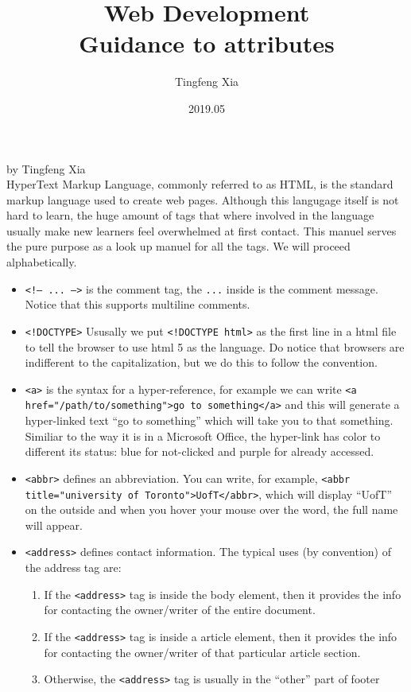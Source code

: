 \documentclass[oneside, 12pt]{article}
\title{%
  \textbf{Web Development}\\
  \large Guidance to attributes}
\author{Tingfeng Xia}
\date{2019.05}
\newcommand{\itemm}[1]{\item \texttt{#1}}
\begin{document}
\maketitle
\newpage %
\mbox{}
\vfill
\noindent by Tingfeng Xia \\


\noindent HyperText Markup Language, commonly referred to as HTML, 
is the standard markup language used to create web pages. Although this langugage itself
is not hard to learn, the huge amount of tags that where involved in the language usually make
new learners feel overwhelmed at first contact. This manuel serves the pure purpose as a 
look up manuel for all the tags. We will proceed alphabetically.
\newpage

\begin{itemize}
	\itemm{<!-- ... -->} is the comment tag, the \texttt{...} inside is the comment
	message. Notice that this supports multiline comments.
	\itemm{<!DOCTYPE>} Ususally we put \texttt{<!DOCTYPE html>} as the first line in a html file
	to tell the browser to use html 5 as the language. Do notice that browsers are indifferent
	to the capitalization, but we do this to follow the convention.
	\itemm{<a>} is the syntax for a hyper-reference, for example we can write 
	\texttt{<a href="/path/to/something">go to something</a>} and this will generate a hyper-linked
	text ``go to something'' which will take you to that something. Similiar to the way it is
	in a Microsoft Office, the hyper-link has color to different its status: blue for not-clicked
	and purple for already accessed. 
	\itemm{<abbr>} defines an abbreviation. You can write, for example, 
	\texttt{<abbr title="university of Toronto">UofT</abbr>}, which will display ``UofT'' on the
	outside and when you hover your mouse over the word, the full name will appear.
	\itemm{<address>} defines contact information. The typical uses (by convention) of the address tag are:
		\begin{enumerate}
			\item If the \texttt{<address>} tag is inside the body element, then it provides the info
			for contacting the owner/writer of the entire document.
			\item If the \texttt{<address>} tag is inside a article element, then it provides the info
			for contacting the owner/writer of that particular article section.
			\item Otherwise, the \texttt{<address>} tag is usually in the ``other'' part of footer 

\end{enumerate}
\end{itemize}
\end{document}
